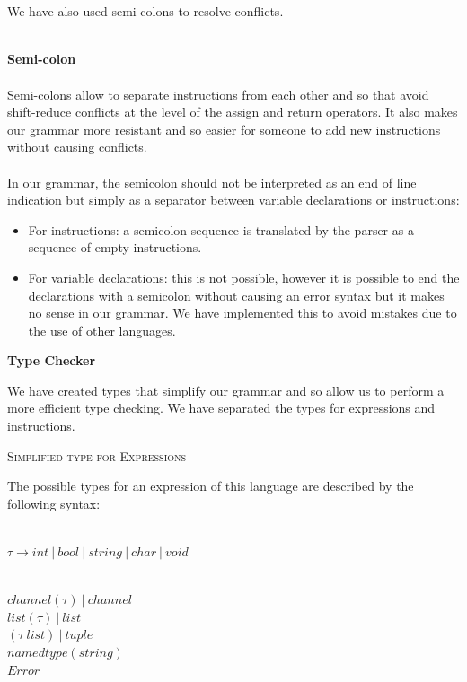 \documentclass[11pt]{report}
\begin{document}
\\ \\
\newpage
We have also used semi-colons to resolve conflicts. \\ \\
{} 
\tabto{2cm} \textbf{Semi-colon} \\ \\
\tabto{1cm}Semi-colons allow to separate instructions from each other and so that avoid shift-reduce conflicts at the level of the assign and return operators. It also makes our grammar more resistant and so easier for someone to add new instructions without causing conflicts. \\ \\
\tabto{1cm} In our grammar, the semicolon should not be interpreted as an end of line indication but simply as a separator between variable declarations or instructions:
\begin{itemize}
\item For instructions: a semicolon sequence is translated by the parser as a sequence of empty instructions.
\item For variable declarations: this is not possible, however it is possible to end the declarations with a semicolon without causing an error syntax but it makes no sense in our grammar. We have implemented this to avoid mistakes due to the use of other languages.
\end{itemize}

\newpage


{}
\centerline{\textbf{\Huge Type Checker}}
\vspace*{15pt}

{}
\vspace*{3pt}
\vspace*{10pt}
\tabto{0.5cm}We have created types that simplify our grammar and so allow us to perform a more efficient type checking. We have separated the types for expressions and instructions.
\vspace*{10pt}
{}
\tabto{1cm} {\Large \textsc{Simplified type for Expressions}}


\tabto{0cm}The possible types for an expression of this language are described by the following syntax:
\\ \\
\centerline{$\tau \rightarrow int \ | \ bool \ | \ string \ | \ char \ | \ void$} \\
$ channel( \tau) \ | \ channel $ \\
$ list(\tau) \ | \ list $ \\
$ ( \tau \ list) \ | \ tuple $ \\
$ namedtype(string)$ \\
$ Error $
\end{document}
